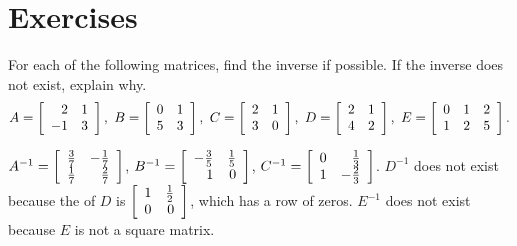 \documentclass{ximera}
\author{Zack Reed}
\begin{document}
\section*{Exercises}

\begin{example}
  For each of the following matrices, find the inverse if possible. If
  the inverse does not exist, explain why.
  \begin{equation*}
    A=\startmat{rr}
      2 & 1 \\
      -1 & 3
    \stopmat,
    \quad
    B=\startmat{rr}
      0 & 1 \\
      5 & 3
    \stopmat,
    \quad
    C=\startmat{rr}
      2 & 1 \\
      3 & 0
    \stopmat,
    \quad
    D=\startmat{rr}
      2 & 1 \\
      4 & 2
    \stopmat,
    \quad
    E=\startmat{rrr}
      0 & 1 & 2 \\
      1 & 2 & 5 \\
    \stopmat.
  \end{equation*}
  \begin{solution}
    \def\arraystretch{1.2}
    $A^{-1} =
    \startmat{rr}
      \frac{3}{7} & -\frac{1}{7} \\
      \frac{1}{7} & \frac{2}{7}
    \stopmat$,
    $B^{-1} =
    \startmat{rr}
      -\frac{3}{5} & \frac{1}{5} \\
      1 & 0
    \stopmat$,
    $C^{-1} =
    \startmat{rr}
      0 & \frac{1}{3} \\
      1 & -\frac{2}{3}
    \stopmat$.
    $D^{-1}$ does not exist because the {\rref} of $D$ is
    $\startmat{rr}
      1 & \frac{1}{2} \\
      0 & 0
    \stopmat$, which has a row of zeros. $E^{-1}$ does not exist
    because $E$ is not a square matrix.
  \end{solution}
\end{example}
\end{document}

